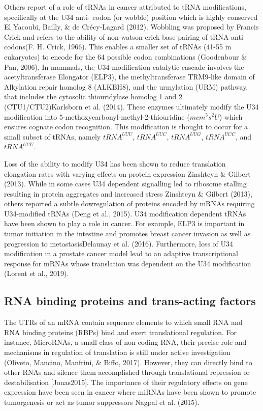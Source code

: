 \documentclass[
  12pt,
  openany]{book}
\begin{document}
Others report of a role of tRNAs in cancer attributed to tRNA modifications, specifically at the U34 anti- codon (or wobble) position which is highly conserved El Yacoubi, Bailly, \& de Crécy-Lagard (2012). Wobbling was proposed by Francis Crick and refers to the ability of non-watson-crick base pairing of tRNA anti codons(F. H. Crick, 1966). This enables a smaller set of tRNAs (41-55 in eukaryotes) to encode for the 64 possible codon combinations (Goodenbour \& Pan, 2006). In mammals, the U34 modification catalytic cascade involves the acetyltransferase Elongator (ELP3), the methyltransferase TRM9-like domain of Alkylation repair homolog 8 (ALKBH8), and the urmylation (URM) pathway, that includes the cytosolic thiouridylase homolog 1 and 2 (CTU1/CTU2)Karlsborn et al. (2014). These enzymes ultimately modify the U34 modification into 5-methoxycarbonyl-methyl-2-thiouridine (\(mcm^5s^2U\)) which ensures cognate codon recognition. This modification is thought to occur for a small subset of tRNAs, namely \(tRNA^{UUU}\), \(tRNA^{UUC}\), \(tRNA^{UUG}\), \(tRNA^{UCC}\), and \(tRNA^{UCU}\).

Loss of the ability to modify U34 has been shown to reduce translation elongation rates with varying effects on protein expression Zinshteyn \& Gilbert (2013). While in some cases U34 dependent signalling led to ribosome stalling resulting in protein aggregates and increased stress Zinshteyn \& Gilbert (2013), others reported a subtle dowregulation of proteins encoded by mRNAs requiring U34-modified tRNAs (Deng et al., 2015). U34 modification dependent tRNAs have been shown to play a role in cancer. For example, ELP3 is important in tumor initiation in the intestine and promotes breast cancer invasion as well as progression to metastasisDelaunay et al. (2016). Furthermore, loss of U34 modification in a prostate cancer model lead to an adaptive transcriptional response for mRNAs whose translation was dependent on the U34 modification (Lorent et al., 2019).

\subsection{RNA binding proteins and trans-acting factors}

The UTRs of an mRNA contain sequence elements to which small RNA and RNA binding proteins (RBPs) bind and exert translational regulation. For instance, MicroRNAs, a small class of non coding RNA, their precise role and mechanisms in regulation of translation is still under active investigation (Oliveto, Mancino, Manfrini, \& Biffo, 2017). However, they can directly bind to other RNAs and silence them accomplished through translational repression or destabilisation {[}Jonas2015{]}. The importance of their regulatory effects on gene expression have been seen in cancer where miRNAs have been shown to promote tumorgenesis or act as tumor suppressors Nagpal et al. (2015).
\end{document}
